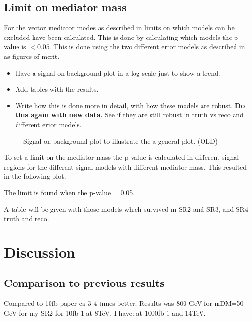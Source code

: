 \newpage
\subsection{Limit on mediator mass}\label{sec:res:subsec:Mm}
For the vector mediator modes as described in  limits on which models can be excluded have been calculated. This is done by calculating which models the p-value is $<0.05$. This is done using the two different error models as described in  as figures of merit.

\begin{itemize}
\item Have a signal on background plot in a log scale just to show a trend.
\item Add tables with the results.
\item Write how this is done more in detail, with how these models are robust. \textbf{Do this again with new data.} See if they are still robust in truth vs reco and different error models.
\end{itemize}


 \begin{figure}[H] %
    \hfill
    \caption{Signal on background plot to illustrate the a general plot. (OLD) }
    \label{fig:sigback}
  \end{figure}

To set a limit on the mediator mass the p-value is calculated in different signal regions for the different signal models with different mediator mass. This resulted in the following plot.

The limit is found when the p-value = 0.05.

A table will be given with those models which survived in SR2 and SR3, and SR4 truth and reco. 

\newpage
\section{Discussion}
\subsection{Comparison to previous results}
Compared to 10fb paper ca 3-4 times better.
Results was 800 GeV for mDM=50 GeV for my SR2 for 10fb-1 at 8TeV.
I have: at 1000fb-1 and 14TeV.


